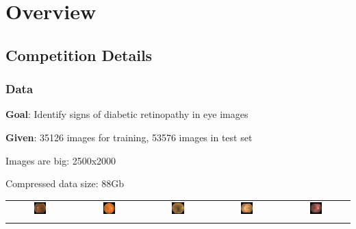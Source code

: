 \section{Overview} 

\subsection{Competition Details}
\begin{frame}\frametitle{Data} 
\par \textbf{Goal}: Identify signs of diabetic retinopathy in eye images
\par \textbf{Given}: 35126 images for training, 53576 images in test set
\par Images are big: 2500x2000
\par Compressed data size: 88Gb

\vspace{5pt}

\begin{tabular}{|@{}c@{}|@{}c@{}|@{}c@{}|@{}c@{}|@{}c@{}|}
\hline
	\includegraphics[width=0.2\textwidth]{pics/classified_samples/197_left_0.jpg} &
	\includegraphics[width=0.2\textwidth]{pics/classified_samples/204_right_1.jpg} &
	\includegraphics[width=0.2\textwidth]{pics/classified_samples/82_right_2.jpg} &
	\includegraphics[width=0.2\textwidth]{pics/classified_samples/687_right_3.jpg} &
	\includegraphics[width=0.2\textwidth]{pics/classified_samples/2496_left_4.jpg} \\\noalign{\vspace{-0.15cm}}
\hline


\end{tabular}
\end{frame}

